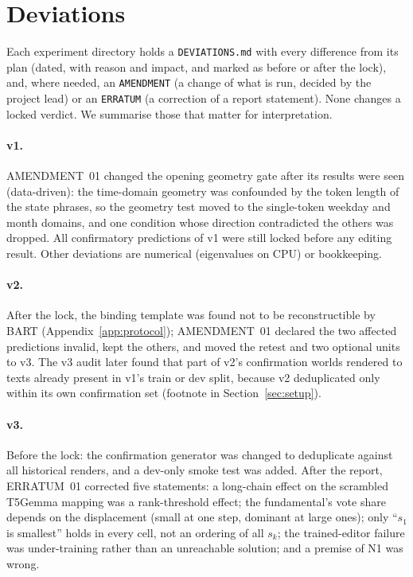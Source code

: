 \section{Deviations}\label{app:deviations}
Each experiment directory holds a \texttt{DEVIATIONS.md} with every difference from its plan (dated, with reason and impact, and marked
as before or after the lock), and, where needed, an \texttt{AMENDMENT} (a change of what is run, decided by the project lead) or an
\texttt{ERRATUM} (a correction of a report statement). None changes a locked verdict. We summarise those that matter for interpretation.

\paragraph{v1.}
AMENDMENT~01 changed the opening geometry gate after its results were seen (data-driven): the time-domain geometry was confounded by the
token length of the state phrases, so the geometry test moved to the single-token weekday and month domains, and one condition whose
direction contradicted the others was dropped. All confirmatory predictions of v1 were still locked before any editing result. Other
deviations are numerical (eigenvalues on CPU) or bookkeeping.

\paragraph{v2.}
After the lock, the binding template was found not to be reconstructible by BART (Appendix~\ref{app:protocol}); AMENDMENT~01 declared the
two affected predictions invalid, kept the others, and moved the retest and two optional units to v3. The v3 audit later found that
part of v2's confirmation worlds rendered to texts already present in v1's train or dev split, because v2 deduplicated only within its
own confirmation set (footnote in Section~\ref{sec:setup}).

\paragraph{v3.}
Before the lock: the confirmation generator was changed to deduplicate against all historical renders, and a dev-only smoke test was
added. After the report, ERRATUM~01 corrected five statements: a long-chain effect on the scrambled T5Gemma mapping was a rank-threshold
effect; the fundamental's vote share depends on the displacement (small at one step, dominant at large ones); only ``$s_1$ is smallest''
holds in every cell, not an ordering of all $s_k$; the trained-editor failure was under-training rather than an unreachable solution; and
a premise of N1 was wrong.

